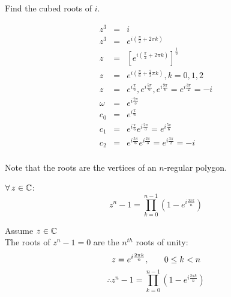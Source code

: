 \documentclass[letterpaper,12pt,fleqn]{article}
\newcommand{\w}{\omega}
\begin{document}
\begin{example}
Find the cubed roots of $i$.

\begin{minipage}{3in}
\begin{eqnarray*}
z^3 &=& i \\
z^3 &=& e^{i(\frac{\pi}{2}+2\pi k)} \\
z &=& \left[e^{i(\frac{\pi}{2}+2\pi k)}\right]^{\frac{1}{3}} \\
z &=& e^{i(\frac{\pi}{6}+\frac{2}{3}\pi k)}, k=0,1,2 \\
z &=& e^{i\frac{\pi}{6}}, e^{i\frac{5\pi}{6}}, e^{i\frac{9\pi}{6}}=e^{i\frac{3\pi}{2}}=-i\\
\w &=& e^{i\frac{2\pi}{3}} \\
c_0 &=& e^{i\frac{\pi}{6}} \\
c_1 &=& e^{i\frac{\pi}{6}}e^{i\frac{2\pi}{3}}=e^{i\frac{5\pi}{6}} \\
c_2 &=& e^{i\frac{5\pi}{6}}e^{i\frac{2\pi}{3}}=e^{i\frac{3\pi}{2}}=-i \\
\end{eqnarray*}
\end{minipage}
\begin{minipage}{3in}
\end{minipage}
\end{example}

Note that the roots are the vertices of an $n$-regular polygon.

\begin{theorem}
  $\forall\,z\in\mathbb{C}$:
  \[z^n-1=\prod_{k=0}^{n-1}{\left(1-e^{i\frac{2\pi k}{n}}\right)}\]
\end{theorem}

\begin{theproof}
  Assume $z\in\mathbb{C}$ \\
  The roots of $z^n-1=0$ are the $n^{th}$ roots of unity:
  \[z=e^{i\frac{2\pi k}{n}},\hspace{0.25in}0\le k<n\]
  \[\therefore z^n-1=\prod_{k=0}^{n-1}{\left(1-e^{i\frac{2\pi k}{n}}\right)}\]
\end{theproof}
\end{document}
